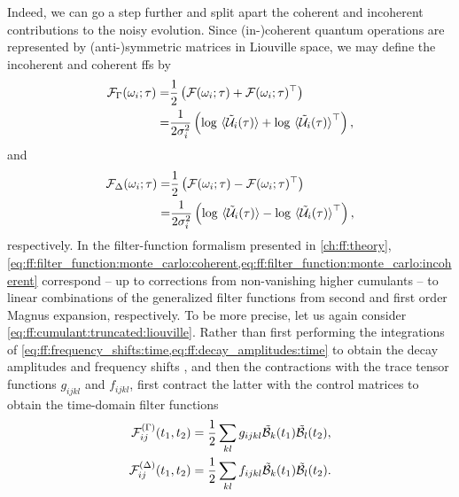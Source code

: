 Indeed, we can go a step further and split apart the coherent and incoherent contributions to the noisy evolution.
Since (in-)coherent quantum operations are represented by (anti-)symmetric matrices in Liouville space, we may define the incoherent and coherent \glspl{ff} by
\begin{equation}\label{eq:ff:filter_function:monte_carlo:incoherent}
    \begin{split}
        \mc{F}_\decayamps(\omega_i;\tau) =& \frac{1}{2}\left(\mc{F}(\omega_i;\tau) + \mc{F}(\omega_i;\tau)\transpose\right) \\
                                         =& \frac{1}{2\sigma_i^2}\left(\log\ev*{\liouvUe_i(\tau)} + \log\ev*{\liouvUe_i(\tau)}\transpose\right),
    \end{split}
\end{equation}
and
\begin{equation}\label{eq:ff:filter_function:monte_carlo:coherent}
    \begin{split}
        \mc{F}_\freqshifts(\omega_i;\tau) =& \frac{1}{2}\left(\mc{F}(\omega_i;\tau) - \mc{F}(\omega_i;\tau)\transpose\right) \\
                                          =& \frac{1}{2\sigma_i^2}\left(\log\ev*{\liouvUe_i(\tau)} - \log\ev*{\liouvUe_i(\tau)}\transpose\right),
    \end{split}
\end{equation}
respectively.
In the filter-function formalism presented in \cref{ch:ff:theory}, \cref{eq:ff:filter_function:monte_carlo:coherent,eq:ff:filter_function:monte_carlo:incoherent} correspond -- up to corrections from non-vanishing higher cumulants -- to linear combinations of the generalized filter functions from second and first order Magnus expansion, respectively.
To be more precise, let us again consider \cref{eq:ff:cumulant:truncated:liouville}.
Rather than first performing the integrations of \cref{eq:ff:frequency_shifts:time,eq:ff:decay_amplitudes:time} to obtain the decay amplitudes \decayamps and frequency shifts \freqshifts, and then the contractions with the trace tensor functions $g_{ijkl}$ and $f_{ijkl}$, first contract the latter with the control matrices to obtain the time-domain filter functions
\begin{align}
    \mathcal{F}^{(\Gamma)}_{ij}(t_1, t_2) &= \frac{1}{2}\sum_{kl} g_{ijkl}\tilde{\mathcal{B}}_{k}(t_1)\tilde{\mathcal{B}}_{l}(t_2), \label{eq:ff:filter_function:cumulant:incoherent}\\
    \mathcal{F}^{(\Delta)}_{ij}(t_1, t_2) &= \frac{1}{2}\sum_{kl} f_{ijkl}\tilde{\mathcal{B}}_{k}(t_1)\tilde{\mathcal{B}}_{l}(t_2). \label{eq:ff:filter_function:cumulant:coherent}
\end{align}
